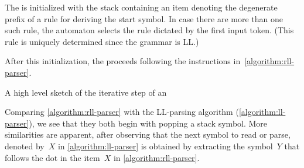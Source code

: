 The \RLLp is initialized with the stack containing an item denoting the
degenerate prefix of a rule for deriving the start symbol. In case there are
more than one such rule, the automaton selects the rule dictated by the first
input token. (This rule is uniquely determined since the grammar is LL.)

After this initialization, the \RLLp proceeds following the instructions
in~\cref{algorithm:rll-parser}.

\begin{algorithm}
  \caption{\label{algorithm:rll-parser}
    A high level sketch of the iterative step of an \RLLp
  }
  \begin{algorithmic}[1]
         \CONTINUE{}
      \FI
      \FI %
    \FI %
      \CONTINUE{}
      \FI %
    \FI %
    \FI
      \CONTINUE{}
    \FI
     
  \end{algorithmic}
\end{algorithm}

Comparing \cref{algorithm:rll-parser} with the LL-parsing algorithm
(\cref{algorithm:ll-parser}), we see that they both begin with popping a stack
symbol. More similarities are apparent, after observing that the next
symbol to read or parse, denoted by~$X$ in \cref{algorithm:ll-parser} is obtained
by extracting the symbol~$Y$ that follows the dot in the item~$X$ in
\cref{algorithm:rll-parser}.

